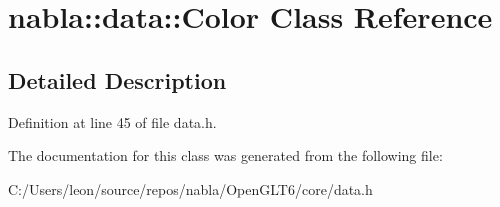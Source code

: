 \hypertarget{classnabla_1_1data_1_1_color}{}\section{nabla\+::data\+::Color Class Reference}
\label{classnabla_1_1data_1_1_color}


\subsection{Detailed Description}


Definition at line 45 of file data.\+h.



The documentation for this class was generated from the following file\+:\begin{DoxyCompactItemize}
\item 
C\+:/\+Users/leon/source/repos/nabla/\+Open\+G\+L\+T6/core/data.\+h\end{DoxyCompactItemize}
